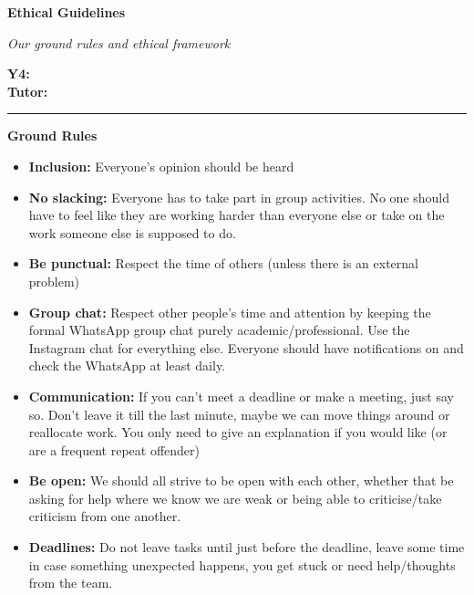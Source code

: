 







\LARGE\textbf{Ethical Guidelines}\\
\normalsize
\begin{large}
    \textit{Our ground rules and ethical framework}
\end{large}


\vspace{1ex}

\textsf{\textbf{Y4:}} \\
\textsf{\textbf{Tutor:}} 


\vspace{1ex}
\hrule
\vspace{2ex}

\Large\textbf{Ground Rules}
\normalsize
\begin{itemize}
    \item \textbf{Inclusion:} Everyone’s opinion should be heard
    \item \textbf{No slacking:} Everyone has to take part in group activities. No one should have to feel like they are working harder than everyone else or take on the work someone else is supposed to do.
    \item \textbf{Be punctual:} Respect the time of others (unless there is an external problem)
    \item \textbf{Group chat:} Respect other people’s time and attention by keeping the formal WhatsApp group chat purely academic/professional. Use the Instagram chat for everything else. Everyone should have notifications on and check the WhatsApp at least daily.
    \item \textbf{Communication:} If you can’t meet a deadline or make a meeting, just say so. Don’t leave it till the last minute, maybe we can move things around or reallocate work. You only need to give an explanation if you would like (or are a frequent repeat offender)
    \item \textbf{Be open:} We should all strive to be open with each other, whether that be asking for help where we know we are weak or being able to criticise/take criticism from one another.
    \item \textbf{Deadlines:} Do not leave tasks until just before the deadline, leave some time in case something unexpected happens, you get stuck or need help/thoughts from the team.
\end{itemize}

